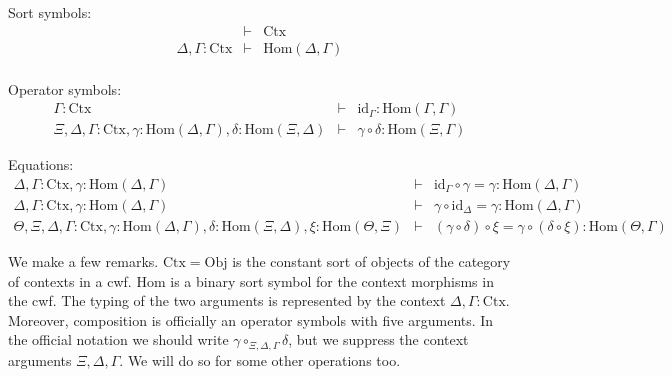\documentclass{lmcs}
\def\Obj{\mathrm{Obj}}
\def\Ctx{\mathrm{Ctx}}
\def\Hom{\mathrm{Hom}}
\def\id{\mathrm{id}}
\begin{document}
Sort symbols:
\begin{eqnarray*}
&\vdash& \Ctx\\
\Delta, \Gamma : \Ctx &\vdash& \Hom(\Delta,\Gamma)\\
\end{eqnarray*}

Operator symbols:
\begin{eqnarray*}
\Gamma : \Ctx &\vdash& \id_\Gamma : \Hom(\Gamma,\Gamma)\\
\Xi,\Delta,\Gamma : \Ctx, \gamma : \Hom(\Delta,\Gamma), \delta : \Hom(\Xi,\Delta) &\vdash&
\gamma \circ \delta : \Hom(\Xi,\Gamma)
\end{eqnarray*}

Equations:
\begin{eqnarray*}
\Delta, \Gamma : \Ctx, \gamma : \Hom(\Delta,\Gamma) &\vdash& \id_\Gamma \circ \gamma = \gamma : \Hom(\Delta,\Gamma)\\
\Delta, \Gamma : \Ctx, \gamma : \Hom(\Delta,\Gamma) &\vdash& \gamma \circ \id_\Delta = \gamma : \Hom(\Delta,\Gamma)\\
\Theta, \Xi,\Delta,\Gamma : \Ctx, \gamma : \Hom(\Delta,\Gamma), \delta : \Hom(\Xi,\Delta), \xi : \Hom(\Theta,\Xi) &\vdash&
(\gamma \circ \delta) \circ \xi = \gamma \circ (\delta \circ \xi): \Hom(\Theta,\Gamma)
\end{eqnarray*}

We make a few remarks. $\Ctx = \Obj$ is the constant sort of objects of the category of contexts in a cwf. $\Hom$ is a binary sort symbol for the context morphisms in the cwf. The typing of the two arguments is represented by the context $\Delta, \Gamma : \Ctx$. 
Moreover, composition is officially an operator symbols with five arguments. In the official notation we should write $\gamma \circ_{\Xi,\Delta,\Gamma} \delta$, but we suppress the context arguments $\Xi,\Delta,\Gamma$. We will do so for some other operations too.
\end{document}
